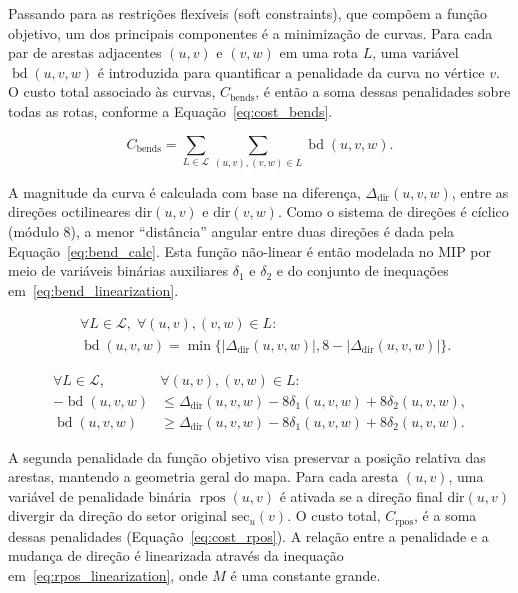 \documentclass[cic,tc]{infufrgs}
\DeclareMathOperator{\bd}{bd}
\DeclareMathOperator{\rpos}{rpos}
\begin{document}
Passando para as restrições flexíveis (soft constraints), que compõem a função objetivo, um dos principais componentes é a minimização de curvas. Para cada par de arestas adjacentes $(u, v)$ e $(v, w)$ em uma rota $L$, uma variável $\bd(u, v, w)$ é introduzida para quantificar a penalidade da curva no vértice $v$. O custo total associado às curvas, $C_{\text{bends}}$, é então a soma dessas penalidades sobre todas as rotas, conforme a Equação~\ref{eq:cost_bends}.

\begin{equation}
C_{\text{bends}} = \sum_{L \in \mathcal{L}} \sum_{(u,v),(v,w) \in L} \bd(u, v, w).
\label{eq:cost_bends}
\end{equation}

A magnitude da curva é calculada com base na diferença, $\Delta_{\text{dir}}(u,v,w)$, entre as direções octilineares $\text{dir}(u, v)$ e $\text{dir}(v, w)$. Como o sistema de direções é cíclico (módulo 8), a menor ``distância'' angular entre duas direções é dada pela Equação~\ref{eq:bend_calc}. Esta função não-linear é então modelada no MIP por meio de variáveis binárias auxiliares $\delta_1$ e $\delta_2$ e do conjunto de inequações em~\ref{eq:bend_linearization}.

\begin{equation}
\begin{aligned}
&\forall L \in \mathcal{L}, \; \forall (u,v),(v,w) \in L: \\
&\bd(u, v, w) = \min\{|\Delta_{\text{dir}}(u,v,w)|, 8 - |\Delta_{\text{dir}}(u,v,w)|\}.
\end{aligned}
\label{eq:bend_calc}
\end{equation}

\begin{align}
\forall L \in \mathcal{L}, \quad &\forall (u,v),(v,w) \in L: \label{eq:bend_linearization} \\
-\bd(u, v, w) &\le \Delta_{\text{dir}}(u,v,w) - 8\delta_1(u, v, w) + 8\delta_2(u, v, w), \nonumber \\
\bd(u, v, w) &\ge \Delta_{\text{dir}}(u,v,w) - 8\delta_1(u, v, w) + 8\delta_2(u, v, w). \nonumber
\end{align}

A segunda penalidade da função objetivo visa preservar a posição relativa das arestas, mantendo a geometria geral do mapa. Para cada aresta $(u,v)$, uma variável de penalidade binária $\rpos(u,v)$ é ativada se a direção final $\text{dir}(u,v)$ divergir da direção do setor original $\text{sec}_u(v)$. O custo total, $C_{\text{rpos}}$, é a soma dessas penalidades (Equação~\ref{eq:cost_rpos}). A relação entre a penalidade e a mudança de direção é linearizada através da inequação em~\ref{eq:rpos_linearization}, onde $M$ é uma constante grande.
\end{document}
